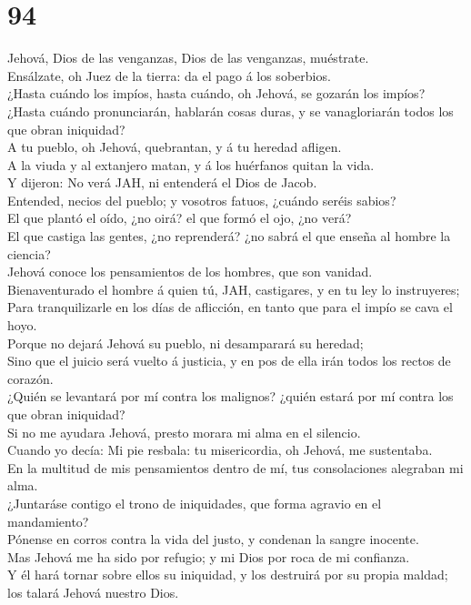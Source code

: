 \hypertarget{section-93}{%
\section{94}\label{section-93}}

 Jehová, Dios de las venganzas, Dios de las venganzas,
muéstrate.\\
 Ensálzate, oh Juez de la tierra: da el pago á los
soberbios.\\
 ¿Hasta cuándo los impíos, hasta cuándo, oh Jehová, se
gozarán los impíos?\\
 ¿Hasta cuándo pronunciarán, hablarán cosas duras, y se
vanagloriarán todos los que obran iniquidad?\\
 A tu pueblo, oh Jehová, quebrantan, y á tu heredad
afligen.\\
 A la viuda y al extanjero matan, y á los huérfanos quitan
la vida.\\
 Y dijeron: No verá JAH, ni entenderá el Dios de Jacob.\\
 Entended, necios del pueblo; y vosotros fatuos, ¿cuándo
seréis sabios?\\
 El que plantó el oído, ¿no oirá? el que formó el ojo, ¿no
verá?\\
 El que castiga las gentes, ¿no reprenderá? ¿no sabrá el
que enseña al hombre la ciencia?\\
 Jehová conoce los pensamientos de los hombres, que son
vanidad.\\
 Bienaventurado el hombre á quien tú, JAH, castigares, y en
tu ley lo instruyeres;\\
 Para tranquilizarle en los días de aflicción, en tanto que
para el impío se cava el hoyo.\\
 Porque no dejará Jehová su pueblo, ni desamparará su
heredad;\\
 Sino que el juicio será vuelto á justicia, y en pos de
ella irán todos los rectos de corazón.\\
 ¿Quién se levantará por mí contra los malignos? ¿quién
estará por mí contra los que obran iniquidad?\\
 Si no me ayudara Jehová, presto morara mi alma en el
silencio.\\
 Cuando yo decía: Mi pie resbala: tu misericordia, oh
Jehová, me sustentaba.\\
 En la multitud de mis pensamientos dentro de mí, tus
consolaciones alegraban mi alma.\\
 ¿Juntaráse contigo el trono de iniquidades, que forma
agravio en el mandamiento?\\
 Pónense en corros contra la vida del justo, y condenan la
sangre inocente.\\
 Mas Jehová me ha sido por refugio; y mi Dios por roca de
mi confianza.\\
 Y él hará tornar sobre ellos su iniquidad, y los destruirá
por su propia maldad; los talará Jehová nuestro Dios.

